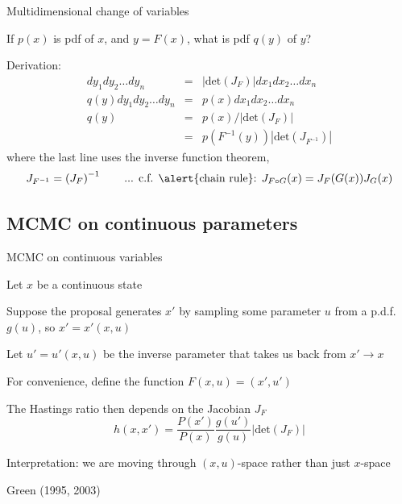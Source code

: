\documentclass{beamer}
\begin{document}
\begin{frame}{Multidimensional change of variables}

\itemb
 \item If $p(x)$ is pdf of $x$, and $y=F(x)$, what is pdf $q(y)$ of $y$?
 \item Derivation:
\begin{eqnarray*}
dy_1 dy_2 \ldots dy_n & = & \left|\mbox{det}\left(J_F\right)\right| dx_1 dx_2 \ldots dx_n \\
q(y) dy_1 dy_2 \ldots dy_n & = & p(x) dx_1 dx_2 \ldots dx_n \\
q(y) & = & p(x) / \left|\mbox{det}\left(J_F\right)\right| \\
& = & p(F^{-1}(y)) \left|\mbox{det}\left(J_{F^{-1}}\right)\right|
\end{eqnarray*}
where the last line uses the \alert{inverse function theorem},
\[
J_{F^{-1}} = \left( J_F \right)^{-1}
 \quad \quad \mbox{... c.f. \alert{chain rule}: $J_{F \circ G}(x) = J_F(G(x)) J_G(x)$}
\]
\iteme

\end{frame}


\subsection{MCMC on continuous parameters}

\begin{frame}{MCMC on continuous variables}

\itemb
\item Let $x$ be a continuous state
\item Suppose the proposal generates $x'$ by sampling some parameter $u$ from a p.d.f. $g(u)$, so $x'=x'(x,u)$
\itemb
 \item Let $u'=u'(x,u)$ be the \alert{inverse} parameter that takes us back from $x' \to x$
 \item For convenience, define the function $F(x,u) = (x',u')$
\iteme
\item The Hastings ratio then depends on the Jacobian $J_F$
\[
h(x,x') = \frac{P(x')}{P(x)} \frac{g(u')}{g(u)} \left| \mbox{det}\left(J_F\right) \right|
\]
\item Interpretation: we are moving through $(x,u)$-space rather than just $x$-space
\item Green (1995, 2003)
\iteme

\end{frame}
\end{document}
